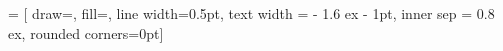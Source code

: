 % 

\renewcommand*{\glspostdescription}{}  %
\makeglossaries  %
\glstoctrue  %


\makeatletter
{} = [
draw=\@todonotes@currentbordercolor,
fill=\@todonotes@currentbackgroundcolor,
line width=0.5pt,
text width = \@todonotes@textwidth - 1.6 ex - 1pt,
inner sep = 0.8 ex,
rounded corners=0pt]
\makeatother




\usepackage{lineno}
\linenumbers
